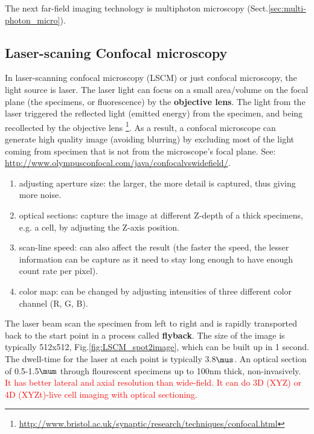 The next far-field imaging technology is multiphoton microscopy
(Sect.\ref{sec:multi-photon_micro}).



\subsection{Laser-scaning Confocal microscopy}
\label{sec:confocal_imaging}

In laser-scanning confocal microscopy (LSCM) or just confocal microscopy, the
light source is laser. The laser light can focus on a small area/volume on the
focal plane (the specimens, or fluorescence) by the {\bf objective lens}. The
light from the laser triggered the reflected light (emitted energy) from the
specimen, and being recollected by the objective lens
\footnote{\url{http://www.bristol.ac.uk/synaptic/research/techniques/confocal.html}}.
As a result, a confocal microscope can generate high quality image (avoiding
blurring) by excluding most of the light coming from specimen that is not from
the microscope's focal plane. See:
\url{http://www.olympusconfocal.com/java/confocalvswidefield/}.
\begin{enumerate}
  \item adjusting aperture size: the larger, the more detail is captured, thus
  giving more noise.
  \item optical sections: capture the image at different Z-depth of a thick
  specimens, e.g. a cell, by adjusting the Z-axis position.
  \item scan-line speed: can also affect the result (the faster the speed, the
  lesser information can be capture as it need to stay long enough to have
  enough count rate per pixel).
  \item color map: can be changed by adjusting intensities of three different
  color channel (R, G, B).
\end{enumerate}
 
The laser beam scan the specimen from left to right and is rapidly transported
back to the start point in a process called {\bf flyback}. The size of the image
is typically 512x512, Fig.\ref{fig:LSCM_spot2image}, which can be built up in 1
second. The dwell-time for the laser at each point is typically 3.8$\mus$. An
optical section of 0.5-1.5$\mum$ through flourescent specimens up to 100nm
thick, non-invasively. \textcolor{red}{It has better lateral and axial
resolution than wide-field. It can do 3D (XYZ) or 4D (XYZt)-live cell imaging
with optical sectioning.}

